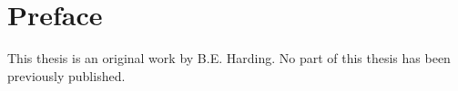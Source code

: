 \chapter*{Preface}

This thesis is an original work by B.E. Harding. No part of this thesis has been previously
published.

